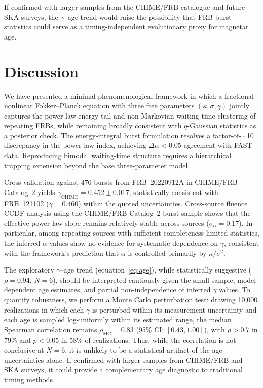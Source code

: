 \documentclass[twocolumn]{article}
\begin{document}
If confirmed with larger samples from the CHIME/FRB catalogue\cite{chime2021catalog,chimefrbcat2} and future SKA surveys, the $\gamma$--age trend would raise the possibility that FRB burst statistics could serve as a timing-independent evolutionary proxy for magnetar age.


\section{Discussion}

We have presented a minimal phenomenological framework in which a fractional nonlinear Fokker--Planck equation with three free parameters $(\kappa, \sigma, \gamma)$ jointly captures the power-law energy tail and non-Markovian waiting-time clustering of repeating FRBs, while remaining broadly consistent with $q$-Gaussian statistics as a posterior check. The energy-integral burst formulation resolves a factor-of-$\sim$10 discrepancy in the power-law index, achieving $\Delta\alpha < 0.05$ agreement with FAST data. Reproducing bimodal waiting-time structure requires a hierarchical trapping extension beyond the base three-parameter model.

Cross-validation against 476 bursts from FRB~20220912A in CHIME/FRB Catalog~2\cite{chimefrbcat2} yields $\gamma_{\mathrm{CHIME}} = 0.452 \pm 0.017$, statistically consistent with FRB~121102 ($\gamma = 0.460$) within the quoted uncertainties. Cross-source fluence CCDF analysis using the CHIME/FRB Catalog~2 burst sample shows that the effective power-law slope remains relatively stable across sources ($\sigma_\alpha = 0.17$). In particular, among repeating sources with sufficient completeness-limited statistics, the inferred $\alpha$ values show no evidence for systematic dependence on $\gamma$, consistent with the framework's prediction that $\alpha$ is controlled primarily by $\kappa/\sigma^2$.

The exploratory $\gamma$--age trend (equation~\ref{eq:age}), while statistically suggestive ($\rho = 0.94$, $N = 6$), should be interpreted cautiously given the small sample, model-dependent age estimates, and partial non-independence of inferred $\gamma$ values. To quantify robustness, we perform a Monte Carlo perturbation test: drawing 10{,}000 realizations in which each $\gamma$ is perturbed within its measurement uncertainty and each age is sampled log-uniformly within its estimated range, the median Spearman correlation remains $\rho_{\mathrm{MC}} = 0.83$ (95\% CI: $[0.43, 1.00]$), with $\rho > 0.7$ in 79\% and $p < 0.05$ in 58\% of realizations. Thus, while the correlation is not conclusive at $N = 6$, it is unlikely to be a statistical artifact of the age uncertainties alone. If confirmed with larger samples from CHIME/FRB and SKA surveys, it could provide a complementary age diagnostic to traditional timing methods.
\end{document}
